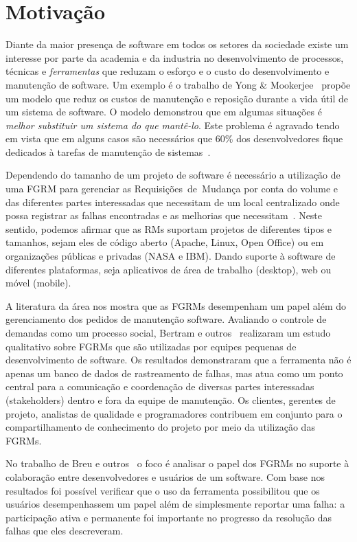 \section{Motivação}
\label{sec:intro-motivacao}

Diante da maior presença de software em todos os setores da sociedade existe um
interesse por parte da academia e da industria no desenvolvimento de processos,
técnicas e \textit{ferramentas} que reduzam o esforço e o custo do
desenvolvimento e manutenção de software. Um exemplo é o trabalho de Yong \&
Mookerjee~\cite{1423995} propõe um modelo que reduz os custos de manutenção e
reposição durante a vida útil de um sistema de software. O modelo demonstrou que
em algumas situações é \textit{melhor substituir um sistema do que mantê-lo}.
Este pro\-ble\-ma é agravado tendo em vista que em alguns casos são necessários
que 60\% dos desenvolvedores fique dedicados à tarefas de manutenção de
sistemas~\cite{Zhang_2003}.

Dependendo do tamanho de um projeto de software é necessário a utilização de uma
FGRM para gerenciar as Requisições~de~Mudança por conta do volume e das
diferentes partes interessadas que necessitam de um local centralizado onde
possa registrar as falhas encontradas e as melhorias que
necessitam~\cite{1407819}. Neste sentido, podemos afirmar que as RMs suportam
projetos de diferentes tipos e tamanhos, sejam eles de código aberto (Apache,
Linux, Open Office) ou em organizações públicas e privadas (NASA e IBM). Dando
suporte à software de diferentes plataformas, seja aplicativos de área de
trabalho (desktop), web ou móvel (mobile).

A literatura da área nos mostra que as FGRMs desempenham um papel além do
gerenciamento dos pedidos de manutenção software. Avaliando o controle de
demandas como um processo social, Bertram e
outros~\cite{Bertram:2010:CCB:1718918.1718972} realizaram um estudo qualitativo
sobre FGRMs que são utilizadas por equipes pequenas de desenvolvimento de
software. Os resultados demonstraram que a ferramenta não é apenas um banco de
dados de rastreamento de falhas, mas atua como um ponto central para a
comunicação e coordenação de diversas partes interessadas (stakeholders) dentro
e fora da equipe de manutenção. Os clientes, gerentes de projeto, analistas de
qualidade e programadores contribuem em conjunto para o compartilhamento de
conhecimento do projeto por meio da utilização das FGRMs.

No trabalho de Breu e outros~\cite{Breu:2010:INB:1718918.1718973} o foco é
analisar o papel dos FGRMs no suporte à colaboração entre desenvolvedores e
usuários de um software. Com base nos resultados foi possível verificar que o
uso da ferramenta possibilitou que os usuários desempenhassem um papel além de
simplesmente reportar uma falha: a participação ativa e permanente foi
importante no progresso da resolução das falhas que eles descreveram.

